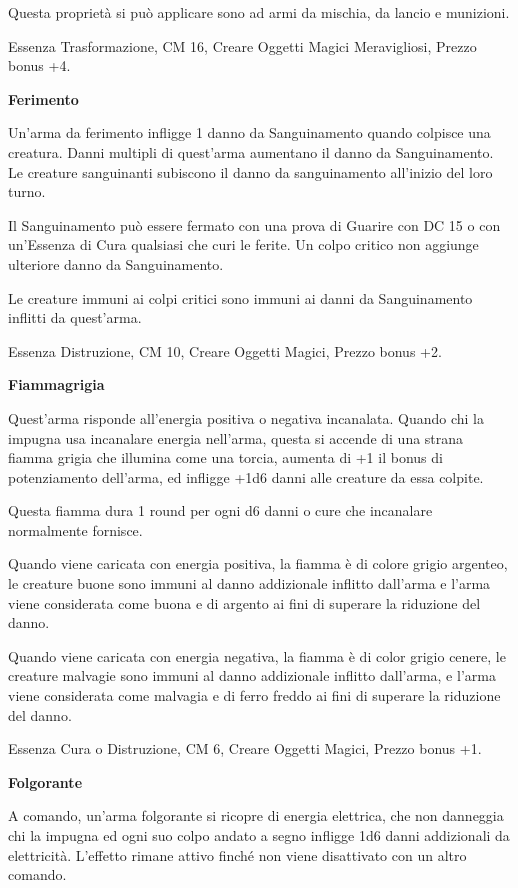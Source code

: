 \documentclass[a4paper,11pt,twoside,openany]{book}
\begin{document}
Questa proprietà si può applicare sono ad armi da mischia, da lancio e munizioni.

Essenza Trasformazione, CM 16, Creare Oggetti Magici Meravigliosi, Prezzo bonus +4.

\textbf{Ferimento}

Un'arma da ferimento infligge 1 danno da Sanguinamento quando colpisce una creatura. Danni multipli di quest'arma aumentano il danno da Sanguinamento. Le creature sanguinanti subiscono il danno da sanguinamento all'inizio del loro turno.

Il Sanguinamento può essere fermato con una prova di Guarire con DC 15 o con un'Essenza di Cura qualsiasi che curi le ferite. Un colpo critico non aggiunge ulteriore danno da Sanguinamento.

Le creature immuni ai colpi critici sono immuni ai danni da Sanguinamento inflitti da quest'arma.

Essenza Distruzione, CM 10, Creare Oggetti Magici, Prezzo bonus +2.

\textbf{Fiammagrigia}

Quest’arma risponde all'energia positiva o negativa incanalata. Quando chi la impugna usa incanalare energia nell'arma, questa si accende di una strana fiamma grigia che illumina come una torcia, aumenta di +1 il bonus di potenziamento dell'arma, ed infligge +1d6 danni alle creature da essa colpite.

Questa fiamma dura 1 round per ogni d6 danni o cure che incanalare normalmente fornisce.

Quando viene caricata con energia positiva, la fiamma è di colore grigio argenteo, le creature buone sono immuni al danno addizionale inflitto dall'arma e l’arma viene considerata come buona e di argento ai fini di superare la riduzione del danno.

Quando viene caricata con energia negativa, la fiamma è di color grigio cenere, le creature malvagie sono immuni al danno addizionale inflitto dall'arma, e l'arma viene considerata come malvagia e di ferro freddo ai fini di superare la riduzione del danno.

Essenza Cura o Distruzione, CM 6, Creare Oggetti Magici, Prezzo bonus +1.

\textbf{Folgorante}

A comando, un'arma folgorante si ricopre di energia elettrica, che non danneggia chi la impugna ed ogni suo colpo andato a segno infligge 1d6 danni addizionali da elettricità. L'effetto rimane attivo finché non viene disattivato con un altro comando.
\end{document}
